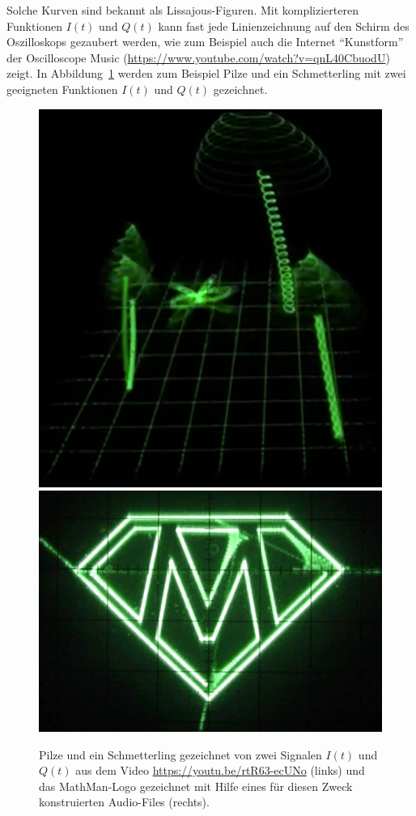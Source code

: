 Solche Kurven sind bekannt als Lissajous-Figuren.
Mit komplizierteren Funktionen $I(t)$ und $Q(t)$ kann fast jede
Linienzeichnung auf den Schirm des Oszilloskops gezaubert werden,
wie zum Beispiel auch die Internet ``Kunstform'' der Oscilloscope
Music (\url{https://www.youtube.com/watch?v=qnL40CbuodU}) zeigt.
In Abbildung~\ref{figure:qam:pilze} werden zum Beispiel Pilze und
ein Schmetterling mit zwei geeigneten Funktionen $I(t)$ und $Q(t)$
gezeichnet.

\begin{figure}
\centering
\includegraphics[width=0.38\hsize]{applications/qam/images/pilze.png}
\;
\includegraphics[width=0.593\hsize]{applications/qam/images/Oscillogo.jpg}
\caption{Pilze und ein Schmetterling gezeichnet von zwei Signalen
$I(t)$ und $Q(t)$ aus dem Video \url{https://youtu.be/rtR63-ecUNo}
(links) und das MathMan-Logo gezeichnet mit
Hilfe eines für diesen Zweck konstruierten Audio-Files (rechts).
\label{figure:qam:pilze}}
\end{figure}



